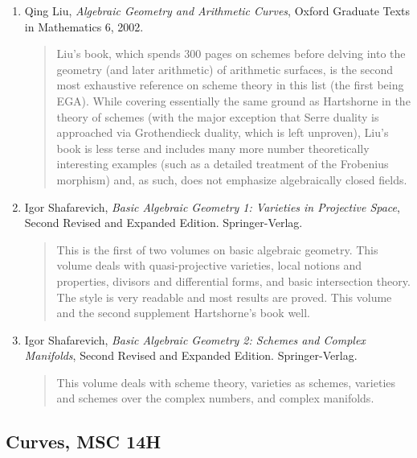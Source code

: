 \documentclass[12pt]{article}
\begin{document}
\begin{enumerate}
\item Qing Liu, \emph{Algebraic Geometry and Arithmetic Curves}, Oxford Graduate Texts in Mathematics 6, 2002.
\begin{quote}
Liu's book, which spends 300 pages on schemes before delving into the geometry (and later arithmetic) of arithmetic surfaces, is the second most exhaustive reference on scheme theory in this list (the first being EGA). While covering essentially the same ground as Hartshorne in the theory of schemes (with the major exception that Serre duality is approached via Grothendieck duality, which is left unproven), Liu's book is less terse and includes many more number theoretically interesting examples (such as a detailed treatment of the Frobenius morphism) and, as such, does not emphasize algebraically closed fields.
\end{quote}
\item Igor Shafarevich, \emph{Basic Algebraic Geometry 1: Varieties in Projective Space}, Second Revised and Expanded Edition. Springer-Verlag.
\begin{quote} This is the first of two volumes on basic algebraic geometry. This volume deals with quasi-projective varieties, local notions and properties, divisors and differential forms, and basic intersection theory. The style is very readable and most results are proved. This volume and the second supplement Hartshorne's book well.
\end{quote}
\item Igor Shafarevich, \emph{Basic Algebraic Geometry 2: Schemes and Complex Manifolds}, Second Revised and Expanded Edition. Springer-Verlag.
\begin{quote}
This volume deals with scheme theory, varieties as schemes, varieties and schemes over the complex numbers, and complex manifolds.
\end{quote}
\end{enumerate}

\subsection*{Curves, MSC 14H}
\end{document}
